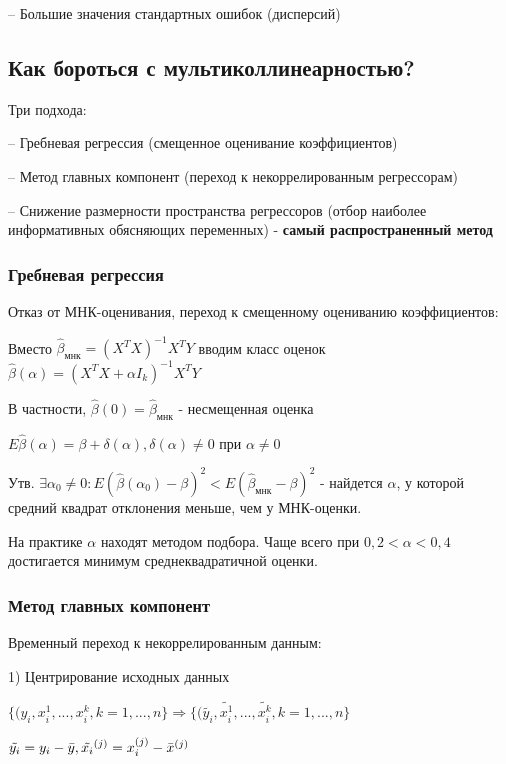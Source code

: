 \documentclass{article}
\begin{document}
\vspace{1mm}
-- Большие значения стандартных ошибок (дисперсий)

\subsection{Как бороться с мультиколлинеарностью?}
Три подхода:\par

\vspace{1mm}
-- Гребневая регрессия (смещенное оценивание коэффициентов)\par

\vspace{1mm}
-- Метод главных компонент (переход к некоррелированным регрессорам)\par

\vspace{1mm}
-- Снижение размерности пространства регрессоров (отбор наиболее информативных обясняющих переменных) - \textbf{самый распространенный метод}\par

\subsubsection{Гребневая регрессия}
Отказ от МНК-оценивания, переход к смещенному оцениванию коэффициентов:\par
Вместо $\hat{\beta}_{\text{мнк}} = (X^TX)^{-1}X^TY$ вводим класс оценок $\hat{\beta}(\alpha) = (X^TX + \alpha I_k)^{-1}X^TY$\par
В частности, $\hat{\beta}(0) = \hat{\beta}_{\text{мнк}}$ - несмещенная оценка

\vspace{2mm}
$E\hat{\beta}(\alpha) = \beta + \delta (\alpha), \delta (\alpha) \neq 0$ при $\alpha \neq 0$\par
Утв. $\exists \alpha_0 \neq 0: E(\hat{\beta}(\alpha_0) - \beta)^2 < E(\hat{\beta}_{\text{мнк}} - \beta)^2$ - найдется $\alpha$, у которой средний квадрат отклонения меньше, чем у МНК-оценки.  \par

\vspace{2mm}
На практике $\alpha$ находят методом подбора. Чаще всего при $0,2<\alpha<0,4$ достигается минимум среднеквадратичной оценки.

\subsubsection{Метод главных компонент}
Временный переход к некоррелированным данным:\par
1) Центрирование исходных данных \par
$\{(y_i, x_i^{1}, ... , x_i^{k}, k = 1, ... , n \} \Longrightarrow \{(\tilde{y_i}, \tilde{x_i^{1}}, ... , \tilde{x_i^{k}}, k = 1, ... , n \}$\par
$\tilde{y_i} = y_i - \Bar{y}, \tilde{x_i}^{(j)} = x_i^{(j)} - \Bar{x}^{(j)}$\par
\end{document}
